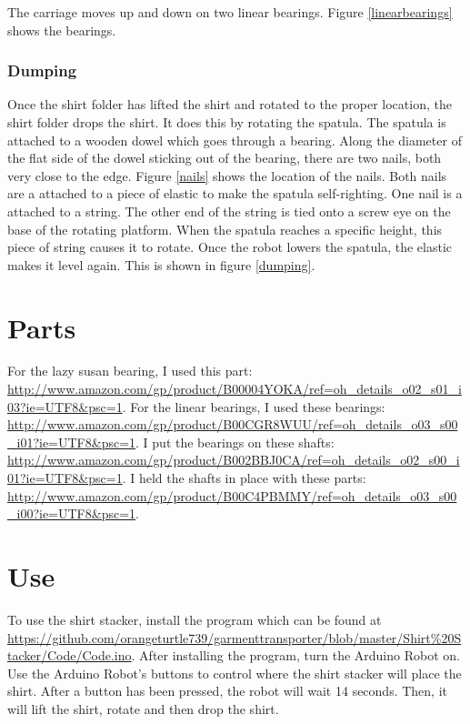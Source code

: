 \documentclass[12pt,letterpaper]{article}
\begin{document}
The carriage moves up and down on two linear bearings. Figure \ref{linearbearings} shows the bearings.

\subsubsection{Dumping}
Once the shirt folder has lifted the shirt and rotated to the proper location, the shirt folder drops the shirt. It does this by rotating the spatula. The spatula is attached to a wooden dowel which goes through a bearing. Along the diameter of the flat side of the dowel sticking out of the bearing, there are two nails, both very close to the edge. Figure \ref{nails} shows the location of the nails. Both nails are a attached to a piece of elastic to make the spatula self-righting. One nail is a attached to a string. The other end of the string is tied onto a screw eye on the base of the rotating platform. When the spatula reaches a specific height, this piece of string causes it to rotate. Once the robot lowers the spatula, the elastic makes it level again. This is shown in figure \ref{dumping}.

\section{Parts}
For the lazy susan bearing, I used this part: \url{http://www.amazon.com/gp/product/B00004YOKA/ref=oh_details_o02_s01_i03?ie=UTF8&psc=1}. For the linear bearings, I used these bearings: \url{http://www.amazon.com/gp/product/B00CGR8WUU/ref=oh_details_o03_s00_i01?ie=UTF8&psc=1}. I put the bearings on these shafts: \url{http://www.amazon.com/gp/product/B002BBJ0CA/ref=oh_details_o02_s00_i01?ie=UTF8&psc=1}. I held the shafts in place with these parts: \url{http://www.amazon.com/gp/product/B00C4PBMMY/ref=oh_details_o03_s00_i00?ie=UTF8&psc=1}.

\section{Use}
To use the shirt stacker, install the program which can be found at \url{https://github.com/orangeturtle739/garmenttransporter/blob/master/Shirt\%20Stacker/Code/Code.ino}. After installing the program, turn the Arduino Robot on. Use the Arduino Robot's buttons to control where the shirt stacker will place the shirt. After a button has been pressed, the robot will wait 14 seconds. Then, it will lift the shirt, rotate and then drop the shirt. 
\end{document}
